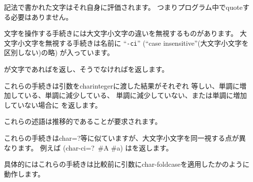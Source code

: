 \sharpsign\backwhack{} 記法で書かれた文字はそれ自身に評価されます。
つまりプログラム中でquoteする必要はありません。

\vest 文字を操作する手続きには大文字小文字の違いを無視するものがあります。
大文字小文字を無視する手続きは名前に
\hbox{``{\tt -ci}''} (``case insensitive''(大文字小文字を区別しない)の略) が入っています。


\begin{entry}{%
}

が文字であれば\schtrue{}を返し、そうでなければ\schfalse{}を返します。

\end{entry}


\begin{entry}{%
}

\label{characterequality}

これらの手続きは引数を{\cf char\coerce{}integer}に渡した結果がそれぞれ
等しい、単調に増加している、単調に減少している、
単調に減少していない、または単調に増加していない場合に
\schtrue{}を返します。

これらの述語は推移的であることが要求されます。

\end{entry}


\begin{entry}{%
}

これらの手続きは{\cf char=?}等に似ていますが、大文字小文字を同一視する点が異なります。
例えば {\cf (char-ci=?\ \#\backwhack{}A \#\backwhack{}a)} は\schtrue{}を返します。

具体的にはこれらの手続きは比較前に引数に{\cf char-foldcase}を適用したかのように動作します。

\end{entry}


